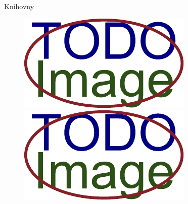 \documentclass[presentation]{beamer}
\begin{document}
\begin{frame}{Knihovny}
  \begin{figure}
    \centering
    \begin{minipage}{.5\textwidth}
      \centering
      \includegraphics[width=.9\linewidth]{../doc-final-thesis/obrazky-figures/placeholder.pdf}
    \end{minipage}%
    \begin{minipage}{.5\textwidth}
      \centering
      \includegraphics[width=.9\linewidth]{../doc-final-thesis/obrazky-figures/placeholder.pdf}
    \end{minipage}
  \end{figure}
\end{frame}
\end{document}
